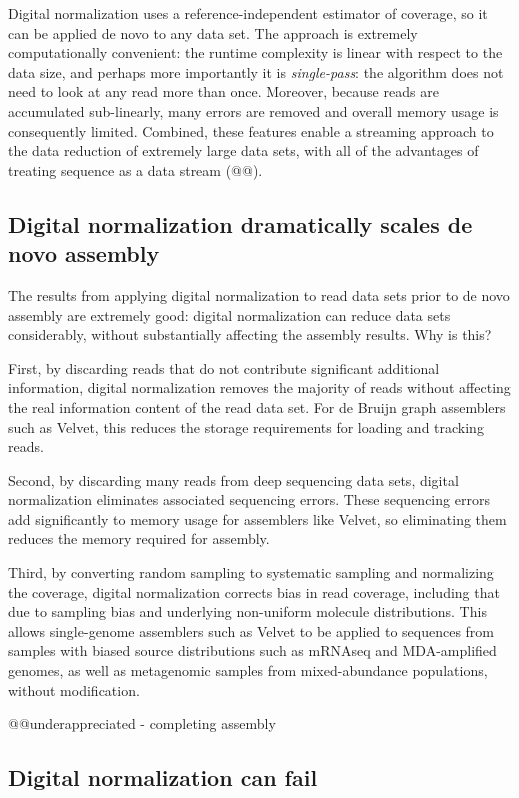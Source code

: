 \documentclass[10pt,draft]{article}
\begin{document}
Digital normalization uses a reference-independent estimator of
coverage, so it can be applied de novo to any data set.  The approach
is extremely computationally convenient: the runtime complexity is
linear with respect to the data size, and perhaps more importantly it
is {\em single-pass}: the algorithm does not need to look
at any read more than once.  Moreover, because reads are accumulated
sub-linearly, many errors are removed and overall memory usage is
consequently limited.  Combined, these features enable a streaming
approach to the data reduction of extremely large data sets, with all
of the advantages of treating sequence as a data stream (@@).

\subsection*{Digital normalization dramatically scales de novo assembly}

The results from applying digital normalization to read data sets
prior to de novo assembly are extremely good: digital normalization
can reduce data sets considerably, without substantially affecting the
assembly results.  Why is this?

First, by discarding reads that do not contribute significant
additional information, digital normalization removes the majority of
reads without affecting the real information content of the read data
set.  For de Bruijn graph assemblers such as Velvet, this reduces the
storage requirements for loading and tracking reads.

Second, by discarding many reads from deep sequencing data sets, digital normalization eliminates
associated sequencing errors.  These sequencing errors add
significantly to memory usage for assemblers like Velvet, so
eliminating them reduces the memory required for assembly.

Third, by converting random sampling to systematic sampling and
normalizing the coverage, digital normalization corrects bias in read
coverage, including that due to sampling bias and underlying
non-uniform molecule distributions.  This allows single-genome
assemblers such as Velvet to be applied to sequences from samples with
biased source distributions such as mRNAseq and MDA-amplified genomes,
as well as metagenomic samples from mixed-abundance populations,
without modification.

@@underappreciated - completing assembly

\subsection*{Digital normalization can fail}
\end{document}
